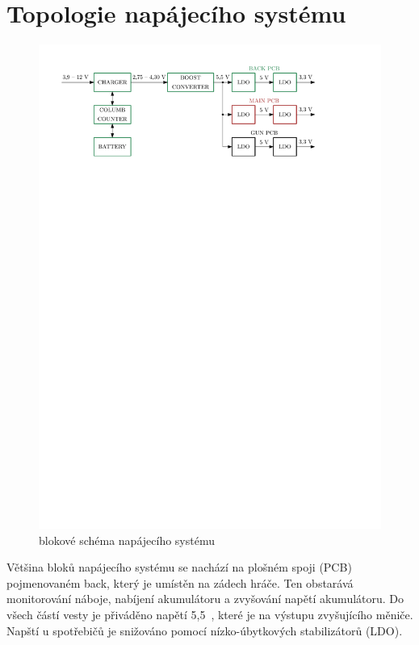 \section{Topologie napájecího systému}
\begin{figure}[H]
    \begin{center}
        \includegraphics[width=\textwidth]{img/power-system}
    \end{center}
    \caption{blokové schéma napájecího systému}
\end{figure}

Většina bloků napájecího systému se nachází na plošném spoji (PCB) pojmenovaném back, který je umístěn na zádech hráče. Ten obstarává monitorování náboje, nabíjení akumulátoru a zvyšování napětí akumulátoru. Do všech částí vesty je přiváděno napětí 5,5~, které je na výstupu zvyšujícího měniče. Napští u spotřebičů je snižováno pomocí nízko-úbytkových stabilizátorů (LDO).
